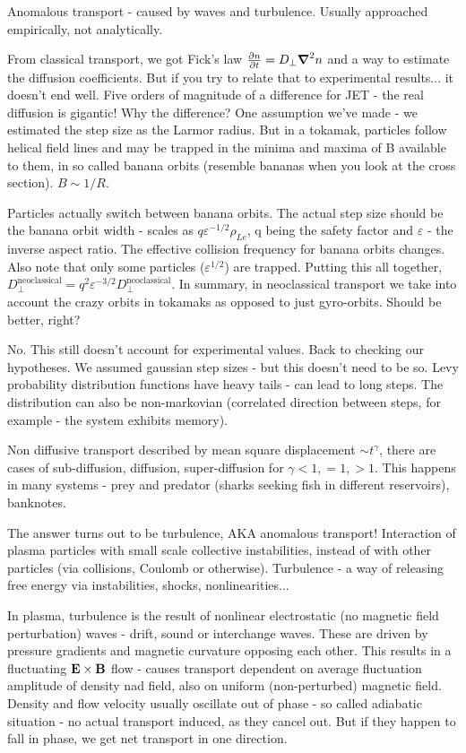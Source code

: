 \documentclass[PlasmaNotes.tex]{subfiles}
\begin{document}
  Anomalous transport - caused by waves and turbulence. Usually approached empirically, not analytically.
  
  From classical transport, we got Fick's law $\frac{\partial n}{\partial t} = D_{\perp} \mbox{\boldmath$ \nabla $} ^2 n$ and a way to estimate the diffusion coefficients. But if you try to relate that to experimental results... it doesn't end well. Five orders of magnitude of a difference for JET - the real diffusion is gigantic! Why the difference? One assumption we've made - we estimated the step size as the Larmor radius. But in a tokamak, particles follow helical field lines and may be trapped in the minima and maxima of B available to them, in so called banana orbits (resemble bananas when you look at the cross section). $B \sim 1/R$.
  
  Particles actually switch between banana orbits. The actual step size should be the banana orbit width - scales as $q \varepsilon^{-1/2} \rho_{Le}$, q being the safety factor and $\varepsilon$ - the inverse aspect ratio. The effective collision frequency for banana orbits changes. Also note that only some particles ($\varepsilon^{1/2}$) are trapped. Putting this all together, $D_\perp^{\text{neoclassical}} = q^2 \varepsilon^{-3/2} D_\perp^{\text{neoclassical}}$. In summary, in neoclassical transport we take into account the crazy orbits in tokamaks as opposed to just gyro-orbits. Should be better, right?
  
  No. This still doesn't account for experimental values. Back to checking our hypotheses. We assumed gaussian step sizes - but this doesn't need to be so. Levy probability distribution functions have heavy tails - can lead to long steps. The distribution can also be non-markovian (correlated direction between steps, for example - the system exhibits memory).
  
  Non diffusive transport described by mean square displacement $\sim t^\gamma$, there are cases of sub-diffusion, diffusion, super-diffusion for $\gamma <1, =1, >1$. This happens in many systems - prey and predator (sharks seeking fish in different reservoirs), banknotes.
  
  The answer turns out to be turbulence, AKA anomalous transport! Interaction of plasma particles with small scale collective instabilities, instead of with other particles (via collisions, Coulomb or otherwise). Turbulence - a way of releasing free energy via instabilities, shocks, nonlinearities...
  
  In plasma, turbulence is the result of nonlinear electrostatic (no magnetic field perturbation) waves - drift, sound or interchange waves. These are driven by pressure gradients and magnetic curvature opposing each other. This results in a fluctuating $\mathbf{E} \times \mathbf{B}$ flow - causes transport dependent on average fluctuation amplitude of density nad field, also on uniform (non-perturbed) magnetic field. Density and flow velocity usually oscillate out of phase - so called adiabatic situation - no actual transport induced, as they cancel out. But if they happen to fall in phase, we get net transport in one direction.
  
\end{document}
